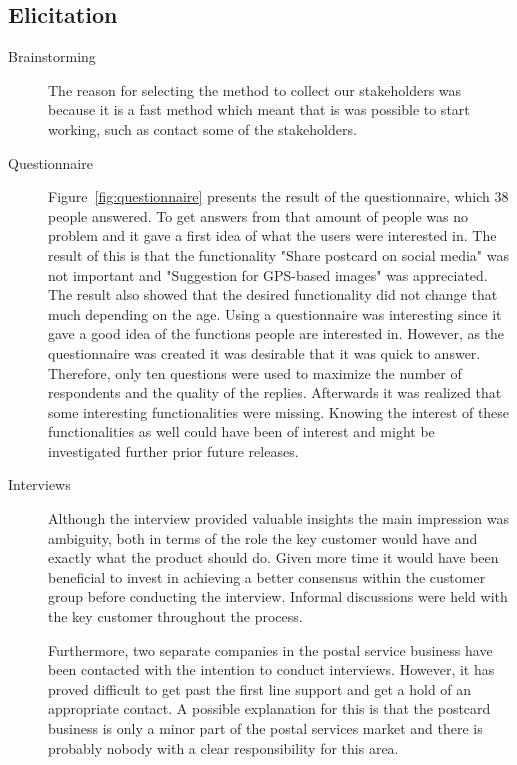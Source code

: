 \documentclass[10pt,a4paper]{article}
\begin{document}
\subsection{Elicitation}
\begin{description}
\item[Brainstorming]The reason for selecting the method to collect our stakeholders was because it is a fast method which meant that is was possible to start working, such as contact some of the stakeholders. 

\item[Questionnaire] Figure~\ref{fig:questionnaire} presents the result of the questionnaire, which 38 people answered. To get answers from that amount of people was no problem and it gave a first idea of what the users were interested in. The result of this is that the functionality "Share postcard on social media" was not important and "Suggestion for GPS-based images" was appreciated. The result also showed that the desired functionality did not change that much depending on the age. Using a questionnaire was interesting since it gave a good idea of the functions people are interested in. However, as the questionnaire  was created it was desirable that it was quick to answer. Therefore, only ten questions were used to maximize the number of respondents and the quality of the replies. Afterwards it was realized that some interesting functionalities were missing. Knowing the interest of these functionalities as well could have been of interest and might be investigated further prior future releases.

\item[Interviews] Although the interview provided valuable insights the main impression was ambiguity, both in terms of the role the key customer would have and exactly what the product should do. Given more time it would have been beneficial to invest in achieving a better consensus within the customer group before conducting the interview. Informal discussions were held with the key customer throughout the process.

Furthermore, two separate companies in the postal service business have been contacted with the intention to conduct interviews. However, it has proved difficult to get past the first line support and get a hold of an appropriate contact. A possible explanation for this is that the postcard business is only a minor part of the postal services market and there is probably nobody with a clear responsibility for this area.  


\end{description}
\end{document}
